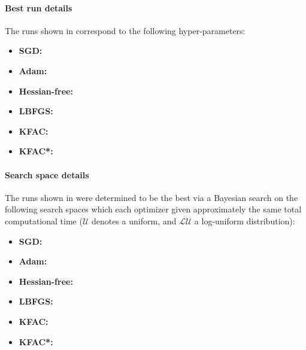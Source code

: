 \paragraph{Best run details}
The runs shown in  correspond to the following hyper-parameters:
\begin{itemize}
  \def\pathToRuns{kfac_pinns_exp/exp31_heat4d_mlp_tanh_256_bayes/tex/}
\item \textbf{SGD:} 
\item \textbf{Adam:} 
\item \textbf{Hessian-free:} 
\item \textbf{LBFGS:} 
\item \textbf{KFAC:} 
\item \textbf{KFAC*:} 
\end{itemize}

\paragraph{Search space details} The runs shown in  were determined to be the best via a Bayesian search on the following search spaces which each optimizer given approximately the same total computational time ($\mathcal{U}$ denotes a uniform, and $\mathcal{LU}$ a log-uniform distribution):
\begin{itemize}
  \def\pathToRuns{kfac_pinns_exp/exp31_heat4d_mlp_tanh_256_bayes/tex/}
\item \textbf{SGD:} 
\item \textbf{Adam:} 
\item \textbf{Hessian-free:} 
\item \textbf{LBFGS:} 
\item \textbf{KFAC:} 
\item \textbf{KFAC*:} 
\end{itemize}

